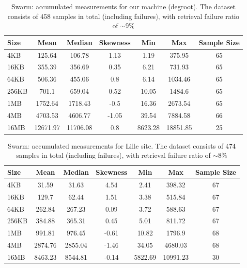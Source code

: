 \begin{table}[H]
\centering
\begin{small}
\caption{Swarm: accumulated measurements for our machine (degroot). The dataset consists of 458 samples in total (including failures), with retrieval failure ratio of $\sim 9\%$ }
\begin{tabular}{@{}lcccccc@{}}
\toprule
Size & Mean & Median & Skewness & Min & Max & Sample Size \\ \midrule
4KB & 125.64 & 106.78 & 1.13 & 1.19 & 375.95 & 65\\
16KB & 355.39 & 356.69 & 0.35 & 6.21 & 731.93 & 65\\
64KB & 506.36 & 455.06 & 0.8 & 6.14 & 1034.46 & 65\\
256KB & 701.1 & 659.04 & 0.52 & 10.05 & 1484.6 & 65\\
1MB & 1752.64 & 1718.43 & -0.5 & 16.36 & 2673.54 & 65\\
4MB & 4703.53 & 4606.77 & -1.05 & 39.54 & 7884.58 & 66\\
16MB & 12671.97 & 11706.08 & 0.8 & 8623.28 & 18851.85 & 25\\
\bottomrule
\end{tabular}
\end{small}
\end{table}

\begin{table}[H]
\centering
\begin{small}
\caption{Swarm: accumulated measurements for Lille site. The dataset consists of 474 samples in total (including failures), with retrieval failure ratio of $\sim 8\%$ }
\begin{tabular}{@{}lcccccc@{}}
\toprule
Size & Mean & Median & Skewness & Min & Max & Sample Size \\ \midrule
4KB & 31.59 & 31.63 & 4.54 & 2.41 & 398.32 & 67\\
16KB & 129.7 & 62.44 & 1.51 & 3.38 & 515.84 & 67\\
64KB & 262.84 & 267.23 & 0.09 & 3.72 & 588.63 & 67\\
256KB & 384.88 & 365.31 & 0.45 & 5.01 & 811.72 & 67\\
1MB & 991.81 & 976.45 & -0.61 & 10.82 & 1796.9 & 68\\
4MB & 2874.76 & 2855.04 & -1.46 & 34.05 & 4680.03 & 68\\
16MB & 8463.23 & 8544.81 & -0.14 & 5822.69 & 10991.23 & 30\\
\bottomrule
\end{tabular}
\end{small}
\end{table}





